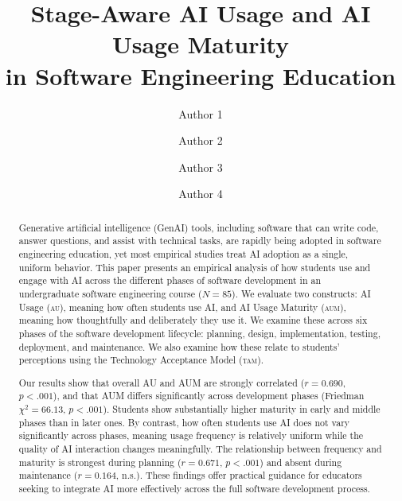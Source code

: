 \documentclass[sigconf,anonymous]{acmart}
\newcommand{\AUM}{\textsc{aum}\xspace}
\newcommand{\AU}{\textsc{au}\xspace}
\newcommand{\TAM}{\textsc{tam}\xspace}
\newcommand{\GenAI}{GenAI\xspace}
\begin{document}
\title{Stage-Aware AI Usage and AI Usage Maturity\\
       in Software Engineering Education}

\author{Author 1}

\author{Author 2}

\author{Author 3}

\author{Author 4}

\begin{abstract}
Generative artificial intelligence (\GenAI) tools, including software that can write code, answer questions, and assist with technical tasks, are rapidly being adopted in software engineering education, yet most empirical studies treat AI adoption as a single, uniform behavior. This paper presents an empirical analysis of how students use and engage with AI across the different phases of software development in an undergraduate software engineering course ($N = 85$). We evaluate two constructs: AI Usage (\AU), meaning how often students use AI, and AI Usage Maturity (\AUM), meaning how thoughtfully and deliberately they use it. We examine these across six phases of the software development lifecycle: planning, design, implementation, testing, deployment, and maintenance. We also examine how these relate to students' perceptions using the Technology Acceptance Model (\TAM).

Our results show that overall AU and AUM are strongly correlated ($r = 0.690$, $p < .001$), and that AUM differs significantly across development phases (Friedman $\chi^{2} = 66.13$, $p < .001$). Students show substantially higher maturity in early and middle phases than in later ones. By contrast, how often students use AI does not vary significantly across phases, meaning usage frequency is relatively uniform while the quality of AI interaction changes meaningfully. The relationship between frequency and maturity is strongest during planning ($r = 0.671$, $p < .001$) and absent during maintenance ($r = 0.164$, n.s.). These findings offer practical guidance for educators seeking to integrate AI more effectively across the full software development process.
\end{abstract}
\end{document}
